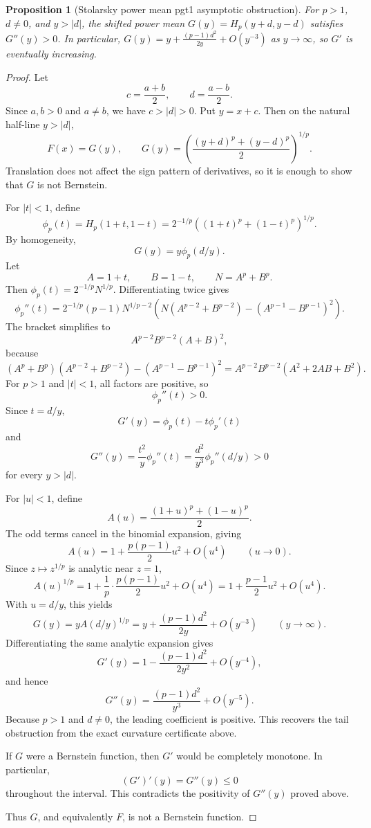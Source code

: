 \documentclass[11pt]{article}
\numberwithin{equation}{section}
\newtheorem{proposition}[theorem]{Proposition}
\theoremstyle{definition}
\theoremstyle{remark}
\newcommand{\1}{\mathbf 1}
\begin{document}
\begin{proposition}[Stolarsky power mean pgt1 asymptotic obstruction]
\label{res:stolarsky-power-mean-pgt1-asymptotic-obstruction}
For \(p>1\), \(d\ne0\), and \(y>|d|\), the shifted power mean \(G(y)=H_p(y+d,y-d)\) satisfies \(G''(y)>0\). In particular, \(G(y)=y+\frac{(p-1)d^2}{2y}+O(y^{-3})\) as \(y\to\infty\), so \(G'\) is eventually increasing.
\end{proposition}

\begin{proof}
Let
\[
c=\frac{a+b}{2},\qquad d=\frac{a-b}{2}.
\]
Since \(a,b>0\) and \(a\ne b\), we have \(c>|d|>0\). Put \(y=x+c\). Then on the natural half-line \(y>|d|\),
\[
F(x)=G(y),
\qquad
G(y)=\left(\frac{(y+d)^p+(y-d)^p}{2}\right)^{1/p}.
\]
Translation does not affect the sign pattern of derivatives, so it is enough to show that \(G\) is not Bernstein.

For \(|t|<1\), define
\[
\phi_p(t)=H_p(1+t,1-t)
=2^{-1/p}\left((1+t)^p+(1-t)^p\right)^{1/p}.
\]
By homogeneity,
\[
G(y)=y\phi_p(d/y).
\]
Let
\[
A=1+t,\qquad B=1-t,\qquad N=A^p+B^p.
\]
Then \(\phi_p(t)=2^{-1/p}N^{1/p}\). Differentiating twice gives
\[
\phi_p''(t)
=2^{-1/p}(p-1)N^{1/p-2}
\left(N(A^{p-2}+B^{p-2})-(A^{p-1}-B^{p-1})^2\right).
\]
The bracket simplifies to
\[
A^{p-2}B^{p-2}(A+B)^2,
\]
because
\[
(A^p+B^p)(A^{p-2}+B^{p-2})-(A^{p-1}-B^{p-1})^2
=A^{p-2}B^{p-2}(A^2+2AB+B^2).
\]
For \(p>1\) and \(|t|<1\), all factors are positive, so
\[
\phi_p''(t)>0.
\]
Since \(t=d/y\),
\[
G'(y)=\phi_p(t)-t\phi_p'(t)
\]
and
\[
G''(y)=\frac{t^2}{y}\phi_p''(t)
=\frac{d^2}{y^3}\phi_p''(d/y)>0
\]
for every \(y>|d|\).

For \(|u|<1\), define
\[
A(u)=\frac{(1+u)^p+(1-u)^p}{2}.
\]
The odd terms cancel in the binomial expansion, giving
\[
A(u)=1+\frac{p(p-1)}{2}u^2+O(u^4)
\qquad (u\to0).
\]
Since \(z\mapsto z^{1/p}\) is analytic near \(z=1\),
\[
A(u)^{1/p}
=1+\frac1p\cdot\frac{p(p-1)}{2}u^2+O(u^4)
=1+\frac{p-1}{2}u^2+O(u^4).
\]
With \(u=d/y\), this yields
\[
G(y)
=yA(d/y)^{1/p}
=y+\frac{(p-1)d^2}{2y}+O(y^{-3})
\qquad (y\to\infty).
\]
Differentiating the same analytic expansion gives
\[
G'(y)
=1-\frac{(p-1)d^2}{2y^2}+O(y^{-4}),
\]
and hence
\[
G''(y)
=\frac{(p-1)d^2}{y^3}+O(y^{-5}).
\]
Because \(p>1\) and \(d\ne0\), the leading coefficient is positive. This recovers the tail obstruction from the exact curvature certificate above.

If \(G\) were a Bernstein function, then \(G'\) would be completely monotone. In particular,
\[
(G')'(y)=G''(y)\le0
\]
throughout the interval. This contradicts the positivity of \(G''(y)\) proved above.

Thus \(G\), and equivalently \(F\), is not a Bernstein function.
\end{proof}
\end{document}
